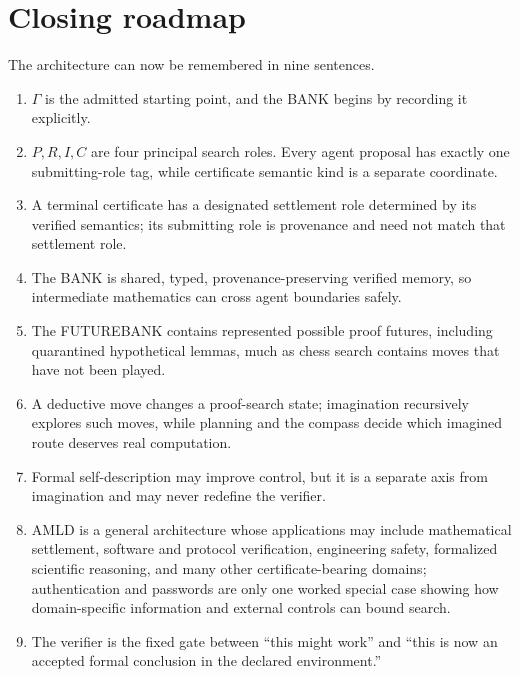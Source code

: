 \documentclass[11pt,openany]{book}
\theoremstyle{definition}
\theoremstyle{remark}
\begin{document}
\chapter*{Closing roadmap}
The architecture can now be remembered in nine sentences.
\begin{enumerate}
\item $\Gamma$ is the admitted starting point, and the BANK begins by recording it explicitly.
\item $P,R,I,C$ are four principal search roles. Every agent proposal has exactly one submitting-role tag, while certificate semantic kind is a separate coordinate.
\item A terminal certificate has a designated settlement role determined by its verified semantics; its submitting role is provenance and need not match that settlement role.
\item The BANK is shared, typed, provenance-preserving verified memory, so intermediate mathematics can cross agent boundaries safely.
\item The FUTUREBANK contains represented possible proof futures, including quarantined hypothetical lemmas, much as chess search contains moves that have not been played.
\item A deductive move changes a proof-search state; imagination recursively explores such moves, while planning and the compass decide which imagined route deserves real computation.
\item Formal self-description may improve control, but it is a separate axis from imagination and may never redefine the verifier.
\item AMLD is a general architecture whose applications may include mathematical settlement, software and protocol verification, engineering safety, formalized scientific reasoning, and many other certificate-bearing domains; authentication and passwords are only one worked special case showing how domain-specific information and external controls can bound search.
\item The verifier is the fixed gate between ``this might work'' and ``this is now an accepted formal conclusion in the declared environment.''
\end{enumerate}
\end{document}
